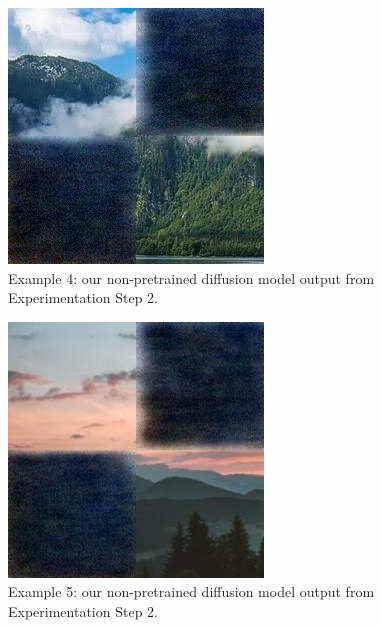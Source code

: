 \documentclass[sigconf]{acmart}
\begin{document}
\begin{figure}[h!]
    \centering
    \includegraphics[width=\linewidth]{diffusion_step_2_4}
    \caption{Example 4: our non-pretrained diffusion model output from Experimentation Step 2.}
    \label{fig:diffusion_step_2_4}
\end{figure}

\begin{figure}[h!]
    \centering
    \includegraphics[width=\linewidth]{diffusion_step_2_5}
    \caption{Example 5: our non-pretrained diffusion model output from Experimentation Step 2.}
    \label{fig:diffusion_step_2_5}
\end{figure}
\end{document}

